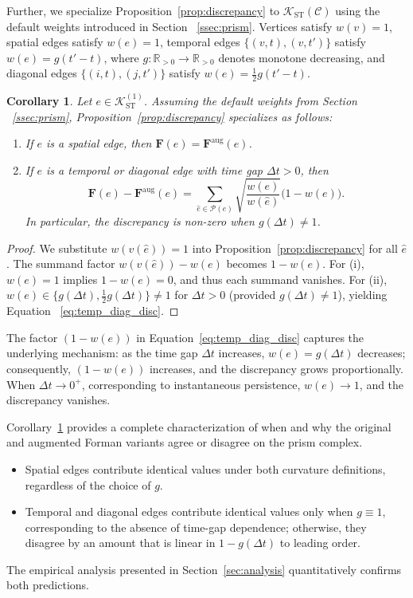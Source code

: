 \documentclass[
    pre,
    twocolumn,
    superscriptaddress,
    showpacs,
    nofootinbib,
    amsmath,
    amssymb,
    floatfix
]{revtex4-2}
\newcommand{\R}{\mathbb{R}}
\newcommand{\K}{\mathcal{K}}
\newcommand{\F}{\mathbf{F}}        %
\newcommand{\Faug}{\F^{\mathrm{aug}}}
\newcommand{\half}{\tfrac{1}{2}}
\newcommand{\dt}{\Delta t}
\theoremstyle{plain} %
\newtheorem{corollary}[theorem]{\indent Corollary}
\theoremstyle{definition} %
\begin{document}
Further, we specialize Proposition~\ref{prop:discrepancy} to $\K_{\mathrm{ST}}(\mathcal{C})$ using the default weights introduced in Section ~\ref{ssec:prism}. Vertices satisfy $w(v)=1$, spatial edges satisfy $w(e)=1$, temporal edges $\{(v,t),(v,t')\}$ satisfy $w(e)=g(t'-t)$, where $g\colon\R_{>0}\to\R_{>0}$ denotes monotone decreasing, and diagonal edges $\{(i,t),(j,t')\}$ satisfy $w(e)=\half g(t'-t)$.

\begin{corollary}\label{cor:prism_specialization}
Let $e \in \K_{\mathrm{ST}}^{(1)}$. Assuming the default weights from Section ~\ref{ssec:prism}, Proposition~\ref{prop:discrepancy} specializes as follows:
\begin{enumerate}
\item[\textnormal{(i)}] If $e$ is a spatial edge, then $\F(e) = \Faug(e)$.
\item[\textnormal{(ii)}] If $e$ is a temporal or diagonal edge with time gap $\Delta t > 0$, then
\begin{equation}\label{eq:temp_diag_disc}
\F(e) - \Faug(e) = \sum_{\hat e \in \mathcal{P}(e)} \sqrt{\frac{w(e)}{w(\hat e)}}\bigl(1 - w(e)\bigr).
\end{equation}
In particular, the discrepancy is non-zero when $g(\Delta t) \neq 1$.
\end{enumerate}
\end{corollary}

\begin{proof}
We substitute $w(v(\hat e)) = 1$ into Proposition~\ref{prop:discrepancy} for all $\hat e$.
The summand factor $w(v(\hat e)) - w(e)$ becomes $1 - w(e)$.
For (i), $w(e) = 1$ implies $1 - w(e) = 0$, and thus each summand vanishes.
For (ii), $w(e) \in \{g(\Delta t), \frac{1}{2}g(\Delta t)\} \neq 1$ for $\Delta t > 0$ (provided $g(\Delta t) \neq 1$), yielding Equation ~\eqref{eq:temp_diag_disc}.
\end{proof}

The factor $(1-w(e))$ in Equation~\eqref{eq:temp_diag_disc} captures the underlying mechanism: as the time gap $\dt$ increases, $w(e)=g(\dt)$ decreases; consequently, $(1-w(e))$ increases, and the discrepancy grows proportionally.
When $\dt\to 0^+$, corresponding to instantaneous persistence, $w(e)\to 1$, and the discrepancy vanishes.

Corollary~\ref{cor:prism_specialization} provides a complete characterization of when and why the original and augmented Forman variants agree or disagree on the prism complex.
\begin{itemize}
\item Spatial edges contribute identical values under both curvature definitions, regardless of the choice of $g$.
\item Temporal and diagonal edges contribute identical values only when $g\equiv 1$, corresponding to the absence of time-gap dependence; otherwise, they disagree by an amount that is linear in $1-g(\dt)$ to leading order.
\end{itemize}
The empirical analysis presented in Section~\ref{sec:analysis} quantitatively confirms both predictions.
\end{document}
